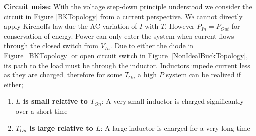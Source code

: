 \documentclass[letterpaper,twocolumn,10pt]{article}
\begin{document}
\textbf{Circuit noise: }With the voltage step-down principle understood we consider the circuit in Figure \ref{BKTopology} from a current perspective. We cannot directly apply Kirchoffs law due the AC variation of $I$ with $T$. However $P_{In} = P_{Out}$ for conservation of energy. Power can only enter the system when current flows through the closed switch from $V_{In}$. Due to either the diode in Figure~\ref{BKTopology} or open circuit switch in Figure~\ref{NonIdealBuckTopology}, its path to the load must be through the inductor. Inductors impede current less as they are charged, therefore for some $T_{On}$ a high $P$ system can be realized if either;\\
\begin{enumerate}
\item{\textbf{$L$ is small relative to $T_{On}$}: A very small inductor is charged significantly over a short time}
\item{\textbf{$T_{On}$ is large relative to $L$}: A large inductor is charged for a very long time}
\end{enumerate}
\end{document}

